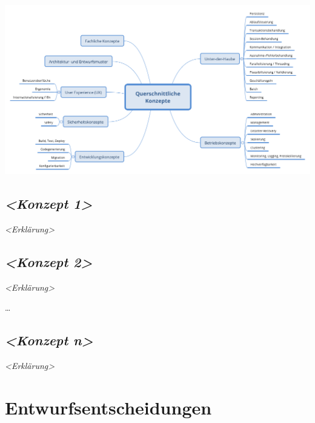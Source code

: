 \documentclass[]{article}
\begin{document}
\includegraphics{images/08-Crosscutting-Concepts-Structure-DE.png}

\hypertarget{__emphasis_konzept_1_emphasis}{%
\subsection{\texorpdfstring{\emph{\textless{}Konzept
1\textgreater{}}}{\textless{}Konzept 1\textgreater{}}}\label{__emphasis_konzept_1_emphasis}}

\emph{\textless{}Erklärung\textgreater{}}

\hypertarget{__emphasis_konzept_2_emphasis}{%
\subsection{\texorpdfstring{\emph{\textless{}Konzept
2\textgreater{}}}{\textless{}Konzept 2\textgreater{}}}\label{__emphasis_konzept_2_emphasis}}

\emph{\textless{}Erklärung\textgreater{}}

\ldots{}

\hypertarget{__emphasis_konzept_n_emphasis}{%
\subsection{\texorpdfstring{\emph{\textless{}Konzept
n\textgreater{}}}{\textless{}Konzept n\textgreater{}}}\label{__emphasis_konzept_n_emphasis}}

\emph{\textless{}Erklärung\textgreater{}}

\hypertarget{section-design-decisions}{%
\section{Entwurfsentscheidungen}\label{section-design-decisions}}
\end{document}
